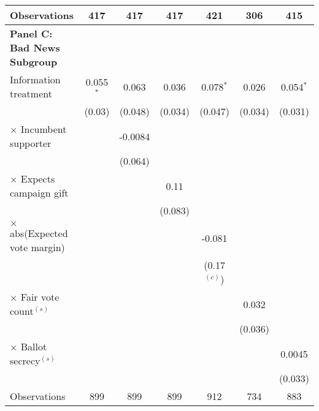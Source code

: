 \begin{center}
\begin{tabular}{l c c c c c c }
    Observations &417&417&417&421&306&415\\
    \hline
    \textbf{Panel C: Bad News Subgroup}\\
    \hline
    Information treatment &0.055$^{*}$&0.063&0.036&0.078$^{*}$&0.026&0.054$^{*}$\\
    &(0.03)&(0.048)&(0.034)&(0.047)&(0.034)&(0.031)\\
    $\times$ Incumbent supporter & &-0.0084& & & & \\
    & &(0.064)& & & & \\
    $\times$ Expects campaign gift & & &0.11 & & & \\
    & & &(0.083) & & & \\
    $\times$ abs(Expected vote margin)  & & & &-0.081& & \\
    & & & &(0.17$^{(c)}$)& & \\
    $\times$ Fair vote count$^{(s)}$ & & & & &0.032& \\
    & & & & &(0.036)& \\
    $\times$ Ballot secrecy$^{(s)}$ & & & & & &0.0045\\
    & & & & & &(0.033)\\
    Observations &899&899&899&912&734&883\\
    \hline\hline
    \end{tabular}
    \end{center}
